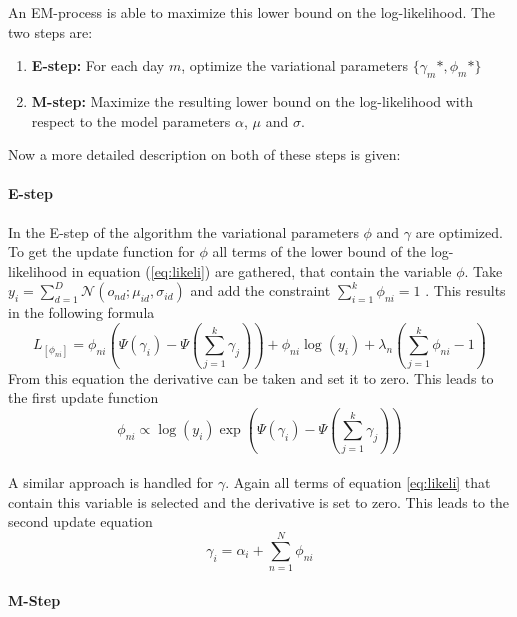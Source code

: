 An EM-process is able to maximize this lower bound on the log-likelihood. The two steps are:
  \begin{enumerate}
   \item \textbf{E-step:} For each day $m$, optimize the variational parameters $\{ \gamma_{m}*,\phi_{m}* \}$
   \item \textbf{M-step:} Maximize the resulting lower bound on the log-likelihood with respect to the model parameters $\alpha$, $\mu$ and $\sigma$.
  \end{enumerate}
  
  Now a more detailed description on both of these steps is given:
  
  \paragraph{E-step}
In the E-step of the algorithm the variational parameters $\phi$ and $\gamma$ are optimized. To get the update function for $\phi$ all terms of the lower bound of the log-likelihood in equation (\ref{eq:likeli}) are gathered, that contain the variable $\phi$. 
Take $y_i=\sum_{d=1}^D \mathcal{N}(o_{nd};\mu_{id},\sigma_{id})$ and add the constraint $\sum_{i=1}^k \phi_{ni}=1 $ . This results in the following formula
\begin{equation}
 L_{[\phi_{ni}]} = \phi_{ni}(\Psi(\gamma_i)-\Psi(\sum_{j=1}^k \gamma_j)) + \phi_{ni} \log(y_i) + \lambda_n(\sum_{j=1}^k \phi_{ni} -1)
\end{equation}
From this equation the derivative can be taken and set it to zero. This leads to the first update function
\begin{equation}
 \phi_{ni} \propto \log(y_i) \exp(\Psi(\gamma_i) - \Psi(\sum_{j=1}^k \gamma_j))
\end{equation}\\

A similar approach is handled for $\gamma$. Again all terms of equation \ref{eq:likeli} that contain this variable is selected and the derivative is set to zero. This leads to the second update equation
\begin{equation}
 \gamma_i = \alpha_i + \sum_{n=1}^N \phi_{ni}
\end{equation}


  \paragraph{M-Step}
  
